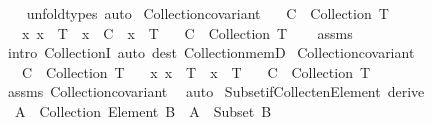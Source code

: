 \begin{isabellebody}
%
\isadelimproof
\ \ %
\endisadelimproof
%
\isatagproof
{}\isamarkupfalse%
\ unfold{\isacharunderscore}{\kern0pt}types\ auto%
\endisatagproof
{\isafoldproof}%
%
\isadelimproof
\isanewline
%
\endisadelimproof
\isanewline
{}\isamarkupfalse%
\ Collection{\isacharunderscore}{\kern0pt}covariant{\isacharcolon}{\kern0pt}\isanewline
\ \ \ {\isachardoublequoteopen}C\ {\isacharcolon}{\kern0pt}\ Collection\ T{\isachardoublequoteclose}\isanewline
\ \ \ {\isachardoublequoteopen}{\isasymAnd}x{\isachardot}{\kern0pt}\ x\ {\isacharcolon}{\kern0pt}\ T\ {\isasymLongrightarrow}\ x\ {\isasymin}\ C\ {\isasymLongrightarrow}\ x\ {\isacharcolon}{\kern0pt}\ T{\isacharprime}{\kern0pt}{\isachardoublequoteclose}\isanewline
\ \ \ {\isachardoublequoteopen}C\ {\isacharcolon}{\kern0pt}\ Collection\ T{\isacharprime}{\kern0pt}{\isachardoublequoteclose}\isanewline
%
\isadelimproof
\ \ %
\endisadelimproof
%
\isatagproof
{}\isamarkupfalse%
\ assms\ \isamarkupfalse%
\ {\isacharparenleft}{\kern0pt}intro\ CollectionI{\isacharparenright}{\kern0pt}\ {\isacharparenleft}{\kern0pt}auto\ dest{\isacharcolon}{\kern0pt}\ Collection{\isacharunderscore}{\kern0pt}memD{\isacharparenright}{\kern0pt}%
\endisatagproof
{\isafoldproof}%
%
\isadelimproof
\isanewline
%
\endisadelimproof
\isanewline
{}\isamarkupfalse%
\ Collection{\isacharunderscore}{\kern0pt}covariant{\isacharprime}{\kern0pt}{\isacharcolon}{\kern0pt}\isanewline
\ \ \ {\isachardoublequoteopen}C\ {\isacharcolon}{\kern0pt}\ Collection\ T{\isachardoublequoteclose}\isanewline
\ \ \ {\isachardoublequoteopen}{\isasymAnd}x{\isachardot}{\kern0pt}\ x\ {\isacharcolon}{\kern0pt}\ T\ {\isasymLongrightarrow}\ x\ {\isacharcolon}{\kern0pt}\ T{\isacharprime}{\kern0pt}{\isachardoublequoteclose}\isanewline
\ \ \ {\isachardoublequoteopen}C\ {\isacharcolon}{\kern0pt}\ Collection\ T{\isacharprime}{\kern0pt}{\isachardoublequoteclose}\isanewline
%
\isadelimproof
\ \ %
\endisadelimproof
%
\isatagproof
{}\isamarkupfalse%
\ assms\ Collection{\isacharunderscore}{\kern0pt}covariant\ \isamarkupfalse%
\ auto%
\endisatagproof
{\isafoldproof}%
%
\isadelimproof
\isanewline
%
\endisadelimproof
\isanewline
{}\isamarkupfalse%
\ Subset{\isacharunderscore}{\kern0pt}if{\isacharunderscore}{\kern0pt}Collecten{\isacharunderscore}{\kern0pt}Element\ {\isacharbrackleft}{\kern0pt}derive{\isacharbrackright}{\kern0pt}{\isacharcolon}{\kern0pt}\isanewline
\ \ {\isachardoublequoteopen}A\ {\isacharcolon}{\kern0pt}\ Collection\ {\isacharparenleft}{\kern0pt}Element\ B{\isacharparenright}{\kern0pt}\ {\isasymLongrightarrow}\ A\ {\isacharcolon}{\kern0pt}\ Subset\ B{\isachardoublequoteclose}\isanewline

\end{isabellebody}
